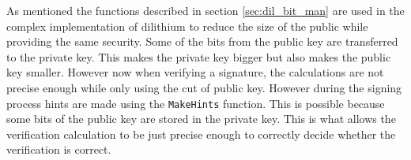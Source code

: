 As mentioned the functions described in section \ref{sec:dil_bit_man} are used in the complex implementation of dilithium to reduce the size of the public while providing the same security. Some of the bits from the public key are transferred to the private key. This makes the private key bigger but also makes the public key smaller. However now when verifying a signature, the calculations are not precise enough while only using the cut of public key. However during the signing process hints are made using the \texttt{MakeHints} function. This is possible because some bits of the public key are stored in the private key. This is what allows the verification calculation to be just precise enough to correctly decide whether the verification is correct. \cite{y0VQZiTmHEg2xvPn}
